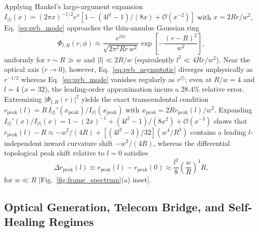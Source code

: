 \documentclass[aps,pra,reprint,amsmath,amssymb,floatfix,longbibliography]{revtex4-2}
\providecommand{\abs}[1]{\lvert#1\rvert}
\begin{document}
Applying Hankel's large-argument expansion $I_{\abs{l}}(x) = (2\pi x)^{-1/2} e^x [1 - (4l^2-1)/(8x) + \mathcal{O}(x^{-2})]$ with $x = 2Rr/w^2$, Eq.~\eqref{eq:pvb_mode} approaches the thin-annulus Gaussian ring~\cite{Ferreira2026}
\begin{equation}
\Phi_{l,R}(r,\phi) \approx \frac{e^{il\phi}}{\sqrt{2\pi^2 R r\, w^2}} \exp\!\left[-\frac{(r - R)^2}{w^2}\right],
\label{eq:pvb_asymptotic}
\end{equation}
uniformly for $r \sim R \gg w$ and $\abs{l} \ll 2R/w$ (equivalently $l^2 \ll 4Rr/w^2$). Near the optical axis ($r \to 0$), however, Eq.~\eqref{eq:pvb_asymptotic} diverges unphysically as $r^{-1/2}$ whereas Eq.~\eqref{eq:pvb_mode} vanishes regularly as $r^{\abs{l}}$; even at $R/w = 4$ and $l = 4$ ($x = 32$), the leading-order approximation incurs a $28.4\%$ relative error. Extremizing $\abs{\Phi_{l,R}(r)}^2$ yields the exact transcendental condition $r_{\mathrm{peak}}(l) = R\,I_{\abs{l}}'(x_{\mathrm{peak}})/I_{\abs{l}}(x_{\mathrm{peak}})$ with $x_{\mathrm{peak}} = 2R r_{\mathrm{peak}}(l)/w^2$. Expanding $I_{\abs{l}}'(x)/I_{\abs{l}}(x) = 1 - (2x)^{-1} + (4l^2-1)/(8x^2) + \mathcal{O}(x^{-3})$ shows that $r_{\mathrm{peak}}(l) - R \approx -w^2/(4R) + [(4l^2-3)/32](w^4/R^3)$ contains a leading $l$-independent inward curvature shift $-w^2/(4R)$, whereas the differential topological peak shift relative to $l = 0$ satisfies
\begin{equation}
\Delta r_{\mathrm{peak}}(l) \equiv r_{\mathrm{peak}}(l) - r_{\mathrm{peak}}(0) \approx \frac{l^2}{8}\left(\frac{w}{R}\right)^4 R,
\label{eq:peak_shift}
\end{equation}
for $w \ll R$ [Fig.~\ref{fig:frame_spectrum}(a) inset].

\subsection{Optical Generation, Telecom Bridge, and Self-Healing Regimes}
\label{subsec:pvb_generation}
\end{document}
